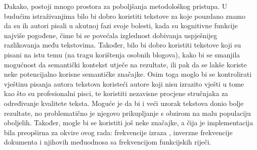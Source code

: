 \documentclass[10pt, a4paper]{article}
\begin{document}
Dakako, postoji mnogo prostora za poboljšanja metodološkog pristupa. U budućim istraživanjima bilo bi dobro koristiti tekstove za koje pouzdano znamo da su ih autori pisali u akutnoj fazi svoje bolesti, kada su kognitivne funkcije najviše pogođene, čime bi se povećala izglednost dobivanja uspješnijeg razlikovanja među tekstovima. Također, bilo bi dobro koristiti tekstove koji su pisani na istu temu (na tragu korištenja osobnih blogova), kako bi se smanjila mogućnost da semantički kontekst utječe na rezultate, ili pak da se lakše koriste neke potencijalno korisne semantičke značajke. Osim toga moglo bi se kontrolirati vještinu pisanja autora tekstova koristeći autore koji nisu izrazito vješti u tome kao što su profesionalni pisci, te koristiti nezavisne procjene stručnjaka za određivanje kvalitete teksta. Moguće je da bi i veći uzorak tekstova donio bolje rezultate, no problematično je njegovo prikupljanje s obzirom na malu populaciju oboljelih. Također, mogle bi se koristiti još neke značajke, a čija je implementacija bila preopširna za okvire ovog rada: frekvencije izraza , inverzne frekvencije dokumenta  i njihovih međuodnosa sa frekvencijom funkcijskih riječi.


 
\end{document}
